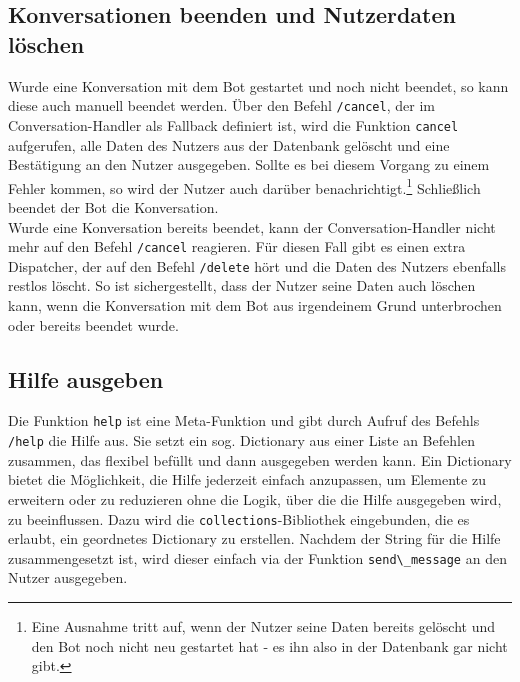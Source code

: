         \subsection{Konversationen beenden und Nutzerdaten löschen} \label{Implementierung: cancel.py}
            Wurde eine Konversation mit dem Bot gestartet und noch nicht beendet, so kann diese auch manuell beendet werden. Über den Befehl \verb|/cancel|, der im Conversation-Handler als Fallback definiert ist, wird die Funktion \verb|cancel| aufgerufen, alle Daten des Nutzers aus der Datenbank gelöscht und eine Bestätigung an den Nutzer ausgegeben. Sollte es bei diesem Vorgang zu einem Fehler kommen, so wird der Nutzer auch darüber benachrichtigt.\footnote{Eine Ausnahme tritt auf, wenn der Nutzer seine Daten bereits gelöscht und den Bot noch nicht neu gestartet hat - es ihn also in der Datenbank gar nicht gibt.} Schließlich beendet der Bot die Konversation.\\

            Wurde eine Konversation bereits beendet, kann der Conversation-Handler nicht mehr auf den Befehl \verb|/cancel| reagieren. Für diesen Fall gibt es einen extra Dispatcher, der auf den Befehl \verb|/delete| hört und die Daten des Nutzers ebenfalls restlos löscht. So ist sichergestellt, dass der Nutzer seine Daten auch löschen kann, wenn die Konversation mit dem Bot aus irgendeinem Grund unterbrochen oder bereits beendet wurde.

        \subsection{Hilfe ausgeben} \label{Implementierung: help.py}
            Die Funktion \verb|help| ist eine Meta-Funktion und gibt durch Aufruf des Befehls \verb|/help| die Hilfe aus. Sie setzt ein sog. Dictionary aus einer Liste an Befehlen zusammen, das flexibel befüllt und dann ausgegeben werden kann. Ein Dictionary bietet die Möglichkeit, die Hilfe jederzeit einfach anzupassen, um Elemente zu erweitern oder zu reduzieren ohne die Logik, über die die Hilfe ausgegeben wird, zu beeinflussen. Dazu wird die \verb|collections|-Bibliothek eingebunden, die es erlaubt, ein geordnetes Dictionary zu erstellen. Nachdem der String für die Hilfe zusammengesetzt ist, wird dieser einfach via der Funktion \verb|send\_message| an den Nutzer ausgegeben.









